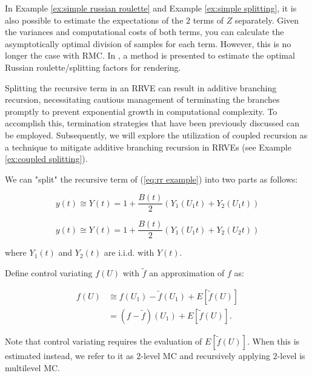 \documentclass[a4paper,12pt]{article}
\begin{document}
\begin{related}
  In Example \ref{ex:simple russian roulette} and Example \ref{ex:simple splitting},
  it is also possible to estimate the expectations of the $2$ terms
  of $Z$ separately. Given the variances and computational costs
  of both terms, you can calculate the asymptotically optimal division
  of samples for each term. However, this is no longer the case with RMC.
  In \cite{rath_ears_2022}, a method is presented to estimate the optimal
  Russian roulette/splitting factors for rendering.
\end{related}

Splitting the recursive term in an RRVE can result in additive branching recursion,
necessitating cautious management of terminating the branches promptly to prevent
exponential growth in computational complexity. To accomplish this, termination
strategies that have been previously discussed can be employed. Subsequently,
we will explore the utilization of coupled recursion as a technique to mitigate
additive branching recursion in RRVEs (see Example \ref{ex:coupled splitting}).

\begin{example} \label{ex:splitting}
  We can "split" the recursive term of (\ref{eq:rr example})
  into two parts as follows:

  \begin{equation}\label{eq:splitting}
    y(t) \cong Y(t) =1 + \frac{B(t)}{2}(Y_{1}(U_{1}t) + Y_{2}(U_{1}t))
  \end{equation}


  \begin{equation}\label{eq:splitting2}
    y(t) \cong Y(t) =1 + \frac{B(t)}{2}(Y_{1}(U_{1}t) + Y_{2}(U_{2}t))
  \end{equation}


  where $Y_{1}(t)$ and $Y_{2}(t)$ are i.i.d. with $Y(t)$.
\end{example}

\begin{definition} \label{CV}
  Define control variating $f(U)$ with $\tilde{f}$ an approximation of $f$ as:

  \begin{align}
    f(U) & \cong f(U_{1})-\tilde{f}(U_{1}) + E[\tilde{f}(U)] \\
         & = (f-\tilde{f})(U_{1}) + E[\tilde{f}(U)]
    .
  \end{align}

  Note that control variating requires the evaluation of
  $E[\tilde{f}(U)]$.  When this is estimated instead, we refer to it as $2$-level MC
  and recursively applying $2$-level is multilevel MC.
\end{definition}
\end{document}
